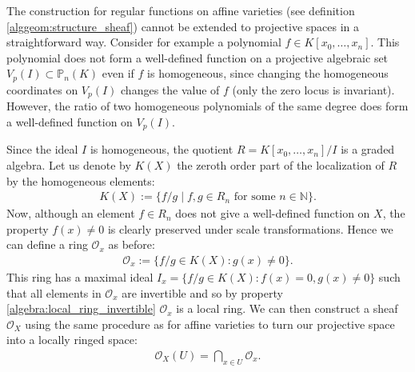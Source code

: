 {{    

    The construction for regular functions on affine varieties (see definition \ref{alggeom:structure_sheaf}) cannot be extended to projective spaces in a straightforward way. Consider for example a polynomial $f\in K[x_0,\ldots,x_n]$. This polynomial does not form a well-defined function on a projective algebraic set $V_p(I)\subset \mathbb{P}_n(K)$ even if $f$ is homogeneous, since changing the homogeneous coordinates on $V_p(I)$ changes the value of $f$ (only the zero locus is invariant). However, the ratio of two homogeneous polynomials of the same degree does form a well-defined function on $V_p(I)$.

    Since the ideal $I$ is homogeneous, the quotient $R=K[x_0,\ldots,x_n]/I$ is a graded algebra. Let us denote by $K(X)$ the zeroth order part of the localization of $R$ by the homogeneous elements:
    \begin{gather}
        K(X) := \{f/g\mid f,g\in R_n\text{ for some }n\in\mathbb{N}\}.
    \end{gather}
    Now, although an element $f\in R_n$ does not give a well-defined function on $X$, the property $f(x)\neq0$ is clearly preserved under scale transformations. Hence we can define a ring $\mathcal{O}_x$ as before:
    \begin{gather}
        \mathcal{O}_x := \{f/g\in K(X): g(x)\neq 0\}.
    \end{gather}
    This ring has a maximal ideal $I_x = \{f/g\in K(X):f(x)=0, g(x)\neq 0\}$ such that all elements in $\mathcal{O}_x$ are invertible and so by property \ref{algebra:local_ring_invertible} $\mathcal{O}_x$ is a local ring. We can then construct a sheaf $\mathcal{O}_X$ using the same procedure as for affine varieties to turn our projective space into a locally ringed space:
    \begin{gather}
        \mathcal{O}_X(U) = \bigcap_{x\in U}\mathcal{O}_x.
    \end{gather}

}}
